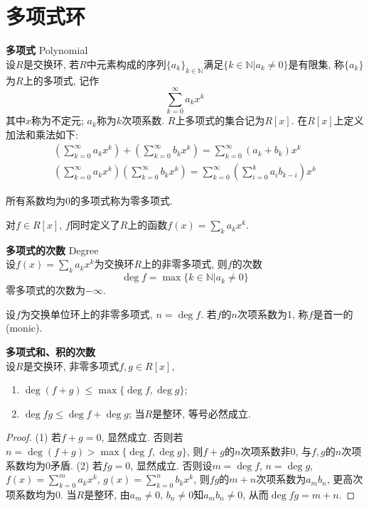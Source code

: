 
\section{多项式环}
\begin{dfn} \textbf{多项式} Polynomial\\
设$R$是交换环, 若$R$中元素构成的序列$\{a_k\}_{k\in \mathbb{N}}$满足$\{k\in \mathbb{N}\vert a_k\neq 0\}$是有限集, 称$\{a_k\}$为$R$上的多项式, 记作
\begin{equation}
    \sum_{k=0}^\infty a_k x^k
\end{equation}
其中$x$称为不定元; $a_k$称为$k$次项系数. $R$上多项式的集合记为$R[x]$. 在$R[x]$上定义加法和乘法如下:
\begin{align}
    \left(\sum_{k=0}^\infty a_k x^k\right) + \left(\sum_{k=0}^\infty b_k x^k\right) = \sum_{k=0}^\infty (a_k+b_k) x^k\\
    \left(\sum_{k=0}^\infty a_k x^k\right)  \left(\sum_{k=0}^\infty b_k x^k\right) = \sum_{k=0}^\infty \left(\sum_{i=0}^k a_ib_{k-i}\right) x^k
\end{align}
\end{dfn}
所有系数均为0的多项式称为零多项式. 

对$f\in R[x]$, $f$同时定义了$R$上的函数$f(x)=\sum_k a_kx^k$. 

\begin{dfn} \textbf{多项式的次数} Degree\\
设$f(x)=\sum_{k} a_kx^k$为交换环$R$上的非零多项式, 则$f$的次数
\begin{equation}
    \deg f = \max \{k\in \mathbb{N}\vert a_k \neq 0\} 
\end{equation}
零多项式的次数为$-\infty$. 
\end{dfn}

设$f$为交换单位环上的非零多项式, $n=\deg f$. 若$f$的$n$次项系数为1, 称$f$是首一的(monic). 

\begin{pro}\textbf{多项式和、积的次数}\\
设$R$是交换环, 非零多项式$f,g \in R[x]$, 
\begin{enumerate}
\item $\deg (f+g) \le \max \{\deg f, \deg g\}$;
\item $\deg fg \le \deg f+\deg g$; 当$R$是整环, 等号必然成立. 
\end{enumerate}
\label{pro:poly_deg}
\end{pro} 

\begin{proof}
(1) 若$f+g=0$, 显然成立. 否则若$n=\deg(f+g)>\max \{\deg f, \deg g\}$, 则$f+g$的$n$次项系数非0, 与$f,g$的$n$次项系数均为0矛盾. (2) 若$fg=0$, 显然成立. 否则设$m=\deg f$, $n=\deg g$, $f(x)=\sum_{k=0}^m a_k x^k$, $g(x)=\sum_{k=0}^n b_k x^k$, 则$fg$的$m+n$次项系数为$a_mb_n$, 更高次项系数均为0. 当$R$是整环, 由$a_m\neq 0$, $b_n\neq 0$知$a_mb_n\neq 0$, 从而$\deg fg = m+n$. 
\end{proof}

